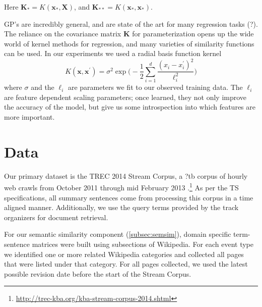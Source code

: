 \documentclass[10pt]{article} \usepackage{url} \usepackage{color}
\begin{document}
Here $\mathbf{K}_* = K(\mathbf{x}_*, \mathbf{X})$, and 
$\mathbf{K}_{**} = K(\mathbf{x}_*, \mathbf{x}_*)$.


GP's are incredibly general, and are state of the art for many regression 
tasks (?). The reliance on the covariance matrix 
$\mathbf{K}$ for parameterization opens up the wide world of kernel methods
for regression, and many varieties of similarity functions can be used.
In our experiments we used a radial basis function kernel 
$$K(\mathbf{x},\mathbf{x}^\prime) = \sigma^2 \exp\bigg(- \frac{1}{2} 
\sum_{i=1}^d \frac{ (x_i-x^\prime_i)^2}{\ell_i^2} \bigg)$$ where 
$\sigma$ and the $\ell_i$ are parameters we fit to our observed training data.
The $\ell_i$ are feature dependent scaling parameters; once learned, they not
only improve the accuracy of the model, but give us some introspection 
into which features are more important.



\section{Data}\label{sec:data}

Our primary dataset is the TREC 2014 Stream Corpus, a ?tb corpus of hourly 
web crawls from October 2011
through mid February 2013 \cite{frank2012building}.\footnote{\url{http://trec-kba.org/kba-stream-corpus-2014.shtml}}
As per the TS specifications, all summary sentences come from processing this
corpus in a time aligned manner. Additionally, we use the query terms 
provided by the track organizers for document retrieval.

For our semantic similarity component (\cref{subsec:semsim}),
domain specific term-sentence matrices were built using subsections of
Wikipedia. For each event type we identified one or more related Wikipedia
categories and collected all pages that were listed under that category.
For all pages collected, we used the latest possible revision date before the
start of the Stream Corpus.
\end{document}

